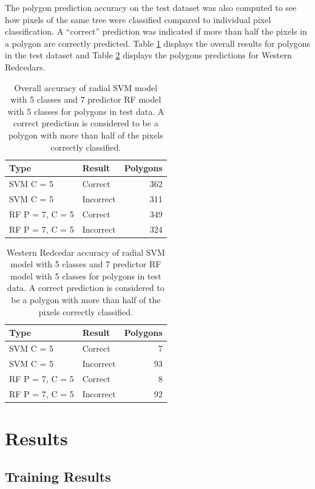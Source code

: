 \documentclass[12pt,twoside]{reedthesis}
\begin{document}
The polygon prediction accuracy on the test dataset was also computed to see how pixels of the same tree were classified compared to individual pixel classification. A ``correct'' prediction was indicated if more than half the pixels in a polygon are correctly predicted. Table \ref{tab:polyTab} displays the overall results for polygons in the test dataset and Table \ref{tab:polyTabRed} displays the polygons predictions for Western Redcedars.
\begin{table}

\caption{\label{tab:polyTab}Overall accuracy of radial SVM model with 5 classes and 7 predictor RF model with 5 classes for polygons in test data. A correct prediction is considered to be a polygon with more than half of the pixels correctly classified.}
\centering
\begin{tabular}[t]{l|l|r}
\hline
Type & Result & Polygons\\
\hline
SVM C = 5 & Correct & 362\\
\hline
SVM C = 5 & Incorrect & 311\\
\hline
RF P = 7, C = 5 & Correct & 349\\
\hline
RF P = 7, C = 5 & Incorrect & 324\\
\hline
\end{tabular}
\end{table}
\begin{table}

\caption{\label{tab:polyTabRed}Western Redcedar accuracy of radial SVM model with 5 classes and 7 predictor RF model with 5 classes for polygons in test data. A correct prediction is considered to be a polygon with more than half of the pixels correctly classified.}
\centering
\begin{tabular}[t]{l|l|r}
\hline
Type & Result & Polygons\\
\hline
SVM C = 5 & Correct & 7\\
\hline
SVM C = 5 & Incorrect & 93\\
\hline
RF P = 7, C = 5 & Correct & 8\\
\hline
RF P = 7, C = 5 & Incorrect & 92\\
\hline
\end{tabular}
\end{table}
\hypertarget{results}{%
\chapter{Results}\label{results}}

\hypertarget{training-results}{%
\section{Training Results}\label{training-results}}
\end{document}
